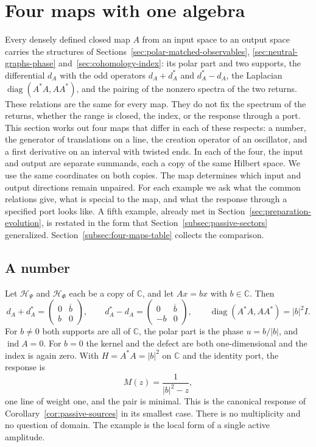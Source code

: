 \documentclass[11pt]{article}
\theoremstyle{definition}
\newcommand{\C}{\mathbb C}
\begin{document}
\section{Four maps with one algebra}
\label{sec:four-maps}

Every densely defined closed map $A$ from an input space to an output space carries the structures of Sections~\ref{sec:polar-matched-observables}, \ref{sec:neutral-graphs-phase} and~\ref{sec:cohomology-index}: its polar part and two supports, the differential $d_A$ with the odd operators $d_A+d_A^*$ and $d_A^*-d_A$, the Laplacian $\operatorname{diag}(A^*A,AA^*)$, and the pairing of the nonzero spectra of the two returns. These relations are the same for every map. They do not fix the spectrum of the returns, whether the range is closed, the index, or the response through a port. This section works out four maps that differ in each of these respects: a number, the generator of translations on a line, the creation operator of an oscillator, and a first derivative on an interval with twisted ends. In each of the four, the input and output are separate summands, each a copy of the same Hilbert space. We use the same coordinates on both copies. The map determines which input and output directions remain unpaired. For each example we ask what the common relations give, what is special to the map, and what the response through a specified port looks like. A fifth example, already met in Section~\ref{sec:preparation-evolution}, is restated in the form that Section~\ref{subsec:passive-sectors} generalized. Section~\ref{subsec:four-maps-table} collects the comparison.

\subsection{A number}
\label{subsec:four-maps-scalar}

Let $\mathcal H_\Psi$ and $\mathcal H_\Phi$ each be a copy of $\C$, and let $Ax=bx$ with $b\in\C$. Then
\begin{equation}
 d_A+d_A^*=\begin{pmatrix}0&\overline b\\ b&0\end{pmatrix},\qquad
 d_A^*-d_A=\begin{pmatrix}0&\overline b\\ -b&0\end{pmatrix},\qquad
 \operatorname{diag}(A^*A,AA^*)=|b|^2I .
 \label{eq:four-maps-scalar}
\end{equation}
For $b\ne0$ both supports are all of $\C$, the polar part is the phase $u=b/|b|$, and $\operatorname{ind}A=0$. For $b=0$ the kernel and the defect are both one-dimensional and the index is again zero. With $H=A^*A=|b|^2$ on $\C$ and the identity port, the response is
\begin{equation}
 M(z)=\frac{1}{|b|^2-z},
 \label{eq:four-maps-scalar-response}
\end{equation}
one line of weight one, and the pair is minimal. This is the canonical response of Corollary~\ref{cor:passive-sources} in its smallest case. There is no multiplicity and no question of domain. The example is the local form of a single active amplitude.
\end{document}
